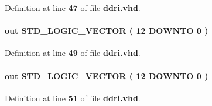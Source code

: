 Definition at line {\bf 47} of file {\bf ddri.\+vhd}.

\paragraph[{dataout\+\_\+h}]{ {\bfseries \textcolor{keywordflow}{out}\textcolor{vhdlchar}{ }} {\bfseries \textcolor{comment}{S\+T\+D\+\_\+\+L\+O\+G\+I\+C\+\_\+\+V\+E\+C\+T\+OR}\textcolor{vhdlchar}{ }\textcolor{vhdlchar}{(}\textcolor{vhdlchar}{ }\textcolor{vhdlchar}{ } \textcolor{vhdldigit}{12} \textcolor{vhdlchar}{ }\textcolor{keywordflow}{D\+O\+W\+N\+TO}\textcolor{vhdlchar}{ }\textcolor{vhdlchar}{ } \textcolor{vhdldigit}{0} \textcolor{vhdlchar}{ }\textcolor{vhdlchar}{)}\textcolor{vhdlchar}{ }} \hspace{0.3cm}{\ttfamily [Port]}}\label{classddri_af7253e4a45b58d7f3d63c079c5868417}


Definition at line {\bf 49} of file {\bf ddri.\+vhd}.

\paragraph[{dataout\+\_\+l}]{ {\bfseries \textcolor{keywordflow}{out}\textcolor{vhdlchar}{ }} {\bfseries \textcolor{comment}{S\+T\+D\+\_\+\+L\+O\+G\+I\+C\+\_\+\+V\+E\+C\+T\+OR}\textcolor{vhdlchar}{ }\textcolor{vhdlchar}{(}\textcolor{vhdlchar}{ }\textcolor{vhdlchar}{ } \textcolor{vhdldigit}{12} \textcolor{vhdlchar}{ }\textcolor{keywordflow}{D\+O\+W\+N\+TO}\textcolor{vhdlchar}{ }\textcolor{vhdlchar}{ } \textcolor{vhdldigit}{0} \textcolor{vhdlchar}{ }\textcolor{vhdlchar}{)}\textcolor{vhdlchar}{ }} \hspace{0.3cm}{\ttfamily [Port]}}\label{classddri_a0081bf5d9f352994296f7c6d35c8be0c}


Definition at line {\bf 51} of file {\bf ddri.\+vhd}.

\paragraph[{ieee}]{\hspace{0.3cm}{\ttfamily [Library]}}\label{classddri_a0a6af6eef40212dbaf130d57ce711256}


